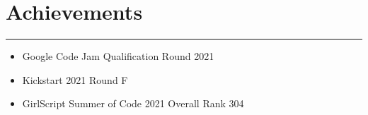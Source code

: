 \documentclass[a4paper,10pt]{article}
\begin{document}
\section*{Achievements}
\vspace{-\baselineskip}
\noindent\rule{\textwidth}{0.1mm}
\vspace{-0.6em}

\begin{itemize}[left=0pt,label=\textbullet,itemsep=0pt,topsep=0pt]

  \item Google Code Jam Qualification Round 2021

  \item Kickstart 2021 Round F

  \item GirlScript Summer of Code 2021 Overall Rank 304

\end{itemize}
\end{document}
